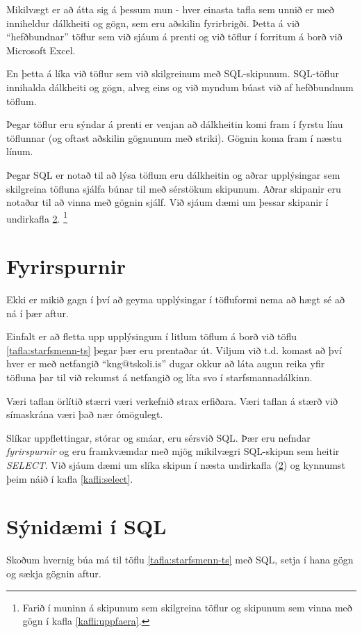 Mikilvægt er að átta sig á þessum mun - hver einasta tafla sem unnið er með inniheldur dálkheiti og gögn, sem eru aðskilin fyrirbrigði. Þetta á við ``hefðbundnar'' töflur sem við sjáum á prenti og við töflur í forritum á borð við Microsoft Excel. 

En þetta á líka við töflur sem við skilgreinum með SQL-skipunum. SQL-töflur innihalda dálkheiti og gögn, alveg eins og við myndum búast við af hefðbundnum töflum.

Þegar töflur eru sýndar á prenti er venjan að dálkheitin komi fram í fyrstu línu töflunnar (og oftast aðskilin gögnunum með striki). Gögnin koma fram í næstu línum.

Þegar SQL er notað til að lýsa töflum eru dálkheitin og aðrar upplýsingar sem skilgreina töfluna sjálfa búnar til með sérstökum skipunum. Aðrar skipanir eru notaðar til að vinna með gögnin sjálf. Við sjáum dæmi um þessar skipanir í undirkafla \ref{undirkafli:synidaemi-i-sql}. \footnote{Farið í muninn á skipunum sem skilgreina töflur og skipunum sem vinna með gögn í kafla \ref{kafli:uppfaera}.}
\section{Fyrirspurnir}
Ekki er mikið gagn í því að geyma upplýsingar í töfluformi nema að hægt sé að ná í þær aftur.

Einfalt er að fletta upp upplýsingum í litlum töflum á borð við töflu \ref{tafla:starfsmenn-ts} þegar þær eru prentaðar út. Viljum við t.d. komast að því hver er með netfangið ``kng@tskoli.is'' dugar okkur að láta augun reika yfir töfluna þar til við rekumst á netfangið og líta svo í starfsmannadálkinn.

Væri taflan örlítið stærri væri verkefnið strax erfiðara. Væri taflan á stærð við símaskrána væri það nær ómögulegt.

Slíkar uppflettingar, stórar og smáar, eru sérsvið SQL. Þær eru nefndar \emph{fyrirspurnir} og eru framkvæmdar með mjög mikilvægri SQL-skipun sem heitir \emph{SELECT}. Við sjáum dæmi um slíka skipun í næsta undirkafla (\ref{undirkafli:synidaemi-i-sql}) og kynnumst þeim náið í kafla \ref{kafli:select}.

\section{Sýnidæmi í SQL}
\label{undirkafli:synidaemi-i-sql}
Skoðum hvernig búa má til töflu \ref{tafla:starfsmenn-ts} með SQL, setja í hana gögn og sækja gögnin aftur. 

